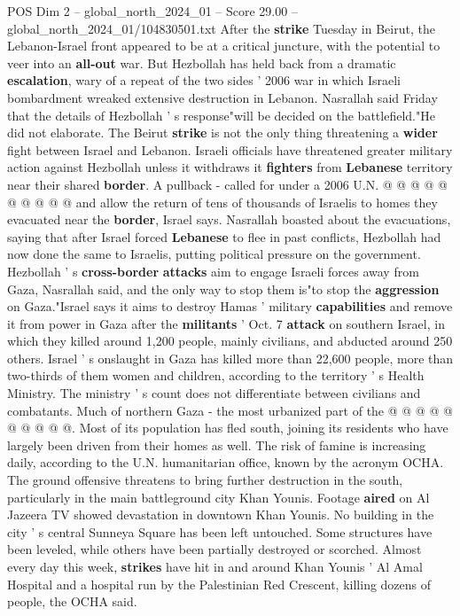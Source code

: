 \begin{textsample}{POS Dim 2 – global\_north\_2024\_01 – Score 29.00 – global\_north\_2024\_01/104830501.txt}
After the \textbf{strike} Tuesday in Beirut, the Lebanon-Israel front appeared to be at a critical juncture, with the potential to veer into an \textbf{all-out} war.
But Hezbollah has held back from a dramatic \textbf{escalation}, wary of a repeat of the two sides ' 2006 war in which Israeli bombardment wreaked extensive destruction in Lebanon.
Nasrallah said Friday that the details of Hezbollah ' s response"will be decided on the battlefield."He did not elaborate.
The Beirut \textbf{strike} is not the only thing threatening a \textbf{wider} fight between Israel and Lebanon.
Israeli officials have threatened greater military action against Hezbollah unless it withdraws it \textbf{fighters} from \textbf{Lebanese} territory near their shared \textbf{border}.
A pullback - called for under a 2006 U.N. @ @ @ @ @ @ @ @ @ @ and allow the return of tens of thousands of Israelis to homes they evacuated near the \textbf{border}, Israel says.
Nasrallah boasted about the evacuations, saying that after Israel forced \textbf{Lebanese} to flee in past conflicts, Hezbollah had now done the same to Israelis, putting political pressure on the government.
Hezbollah ' s \textbf{cross-border} \textbf{attacks} aim to engage Israeli forces away from Gaza, Nasrallah said, and the only way to stop them is"to stop the \textbf{aggression} on Gaza."Israel says it aims to destroy Hamas ' military \textbf{capabilities} and remove it from power in Gaza after the \textbf{militants} ' Oct. 7 \textbf{attack} on southern Israel, in which they killed around 1,200 people, mainly civilians, and abducted around 250 others.
Israel ' s onslaught in Gaza has killed more than 22,600 people, more than two-thirds of them women and children, according to the territory ' s Health Ministry.
The ministry ' s count does not differentiate between civilians and combatants.
Much of northern Gaza - the most urbanized part of the @ @ @ @ @ @ @ @ @ @.
Most of its population has fled south, joining its residents who have largely been driven from their homes as well.
The risk of famine is increasing daily, according to the U.N. humanitarian office, known by the acronym OCHA.
The ground offensive threatens to bring further destruction in the south, particularly in the main battleground city Khan Younis.
Footage \textbf{aired} on Al Jazeera TV showed devastation in downtown Khan Younis.
No building in the city ' s central Sunneya Square has been left untouched.
Some structures have been leveled, while others have been partially destroyed or scorched.
Almost every day this week, \textbf{strikes} have hit in and around Khan Younis ' Al Amal Hospital and a hospital run by the Palestinian Red Crescent, killing dozens of people, the OCHA said.

\end{textsample}
